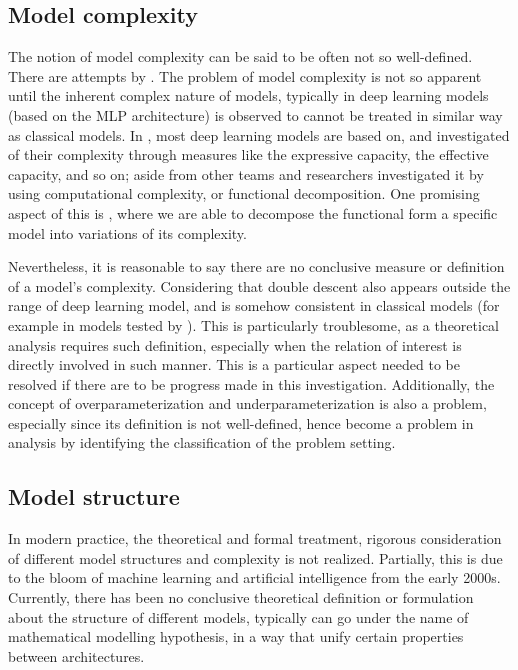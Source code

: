 \documentclass{article}
\begin{document}
\subsection{Model complexity}
The notion of model complexity can be said to be often not so well-defined. There are attempts by \cite{hu2021modelcomplexitydeeplearning,luo2024investigatingimpactmodelcomplexity,barceló2020modelinterpretabilitylenscomputational,Molnar_2020,janik2021complexitydeepneuralnetworks}. The problem of model complexity is not so apparent until the inherent complex nature of models, typically in deep learning models (based on the MLP architecture) is observed to cannot be treated in similar way as classical models. In \cite{hu2021modelcomplexitydeeplearning}, most deep learning models are based on, and investigated of their complexity through measures like the expressive capacity, the effective capacity, and so on; aside from other teams and researchers investigated it by using computational complexity, or functional decomposition. One promising aspect of this is \cite{Molnar_2020}, where we are able to decompose the functional form a specific model into variations of its complexity. 

Nevertheless, it is reasonable to say there are no conclusive measure or definition of a model's complexity. Considering that double descent also appears outside the range of deep learning model, and is somehow consistent in classical models (for example in models tested by \cite{belkin_reconciling_2019}). This is particularly troublesome, as a theoretical analysis requires such definition, especially when the relation of interest is directly involved in such manner. This is a particular aspect needed to be resolved if there are to be progress made in this investigation. Additionally, the concept of overparameterization and underparameterization is also a problem, especially since its definition is not well-defined, hence become a problem in analysis by identifying the classification of the problem setting. 
\subsection{Model structure}

In modern practice, the theoretical and formal treatment, rigorous consideration of different model structures and complexity is not realized. Partially, this is due to the bloom of machine learning and artificial intelligence from the early 2000s. Currently, there has been no conclusive theoretical definition or formulation about the structure of different models, typically can go under the name of mathematical modelling hypothesis, in a way that unify certain properties between architectures. 
\end{document}
